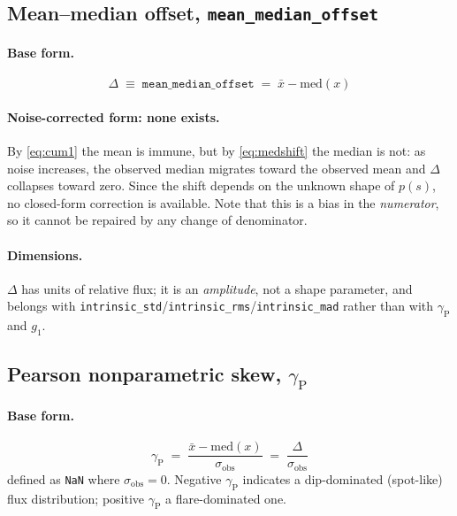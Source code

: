 \documentclass[11pt]{article}
\newcommand{\istd}{\texttt{intrinsic\_std}}
\newcommand{\irms}{\texttt{intrinsic\_rms}}
\newcommand{\imad}{\texttt{intrinsic\_mad}}
\newcommand{\moff}{\texttt{mean\_median\_offset}}
\newcommand{\gp}{\gamma_{\mathrm{P}}}
\newcommand{\sigobs}{\sigma_{\mathrm{obs}}}
\begin{document}
\subsection{Mean--median offset, \moff}
\label{sec:offset}

\paragraph{Base form.}
%
\begin{equation}
  \boxed{\;\Delta \;\equiv\; \moff \;=\; \bar{x} - \mathrm{med}(x)\;}
  \label{eq:offset}
\end{equation}

\paragraph{Noise-corrected form: none exists.} By \eqref{eq:cum1} the mean is
immune, but by \eqref{eq:medshift} the median is not: as noise increases, the
observed median migrates toward the observed mean and $\Delta$ collapses toward
zero. Since the shift depends on the unknown shape of $p(s)$, no closed-form
correction is available. Note that this is a bias in the \emph{numerator}, so it
cannot be repaired by any change of denominator.

\paragraph{Dimensions.} $\Delta$ has units of relative flux; it is an
\emph{amplitude}, not a shape parameter, and belongs with \istd{}/\irms{}/\imad{}
rather than with $\gp$ and $g_1$.

\subsection{Pearson nonparametric skew, $\gp$}
\label{sec:gammap}

\paragraph{Base form.}
%
\begin{equation}
  \boxed{\;\gp \;=\; \frac{\bar{x} - \mathrm{med}(x)}{\sigobs}
                 \;=\; \frac{\Delta}{\sigobs}\;}
  \label{eq:gammap}
\end{equation}
%
defined as \texttt{NaN} where $\sigobs = 0$. Negative $\gp$ indicates a
dip-dominated (spot-like) flux distribution; positive $\gp$ a flare-dominated
one.
\end{document}
